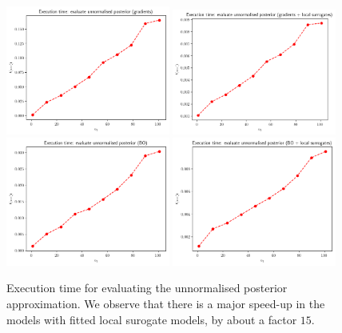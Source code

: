 \begin{figure}[h]
    \begin{center}
      \includegraphics[width=0.48\textwidth]{./Thesis/images/chapter4/exec_posterior_grad.png}
      \includegraphics[width=0.48\textwidth]{./Thesis/images/chapter4/exec_posterior_grad_fit.png}\\
      \includegraphics[width=0.48\textwidth]{./Thesis/images/chapter4/exec_posterior_bo.png}
      \includegraphics[width=0.48\textwidth]{./Thesis/images/chapter4/exec_posterior_bo_fit.png}
    \end{center}
    \caption{Execution time for evaluating the unnormalised posterior
      approximation. We observe that there is a major speed-up in the
      models with fitted local surogate models, by about a factor $15$.}
  \label{fig:exec_posterior}
\end{figure}


